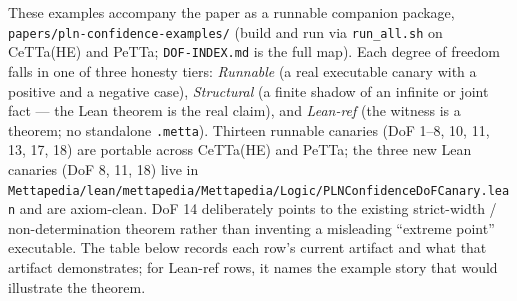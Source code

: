 \documentclass[]{article}
\newcommand{\lpath}[1]{\texttt{\nolinkurl{#1}}}
\begin{document}
These examples accompany the paper as a runnable companion package,
\lpath{papers/pln-confidence-examples/} (build and run via \lpath{run_all.sh}
on CeTTa(HE) and PeTTa; \lpath{DOF-INDEX.md} is the full map). Each degree of
freedom falls in one of three honesty tiers: \emph{Runnable} (a real executable
canary with a positive and a negative case), \emph{Structural} (a finite shadow
of an infinite or joint fact --- the Lean theorem is the real claim), and
\emph{Lean-ref} (the witness is a theorem; no standalone \texttt{.metta}).
Thirteen runnable canaries (DoF 1--8, 10, 11, 13, 17, 18) are portable across
CeTTa(HE) and PeTTa; the three new Lean canaries (DoF 8, 11, 18) live in
\lpath{Mettapedia/lean/mettapedia/Mettapedia/Logic/PLNConfidenceDoFCanary.lean}
and are axiom-clean. DoF 14 deliberately points to the existing strict-width /
non-determination theorem rather than inventing a misleading ``extreme point''
executable. The table
below records each row's current artifact and what that artifact demonstrates;
for Lean-ref rows, it names the example story that would illustrate the theorem.
\end{document}
